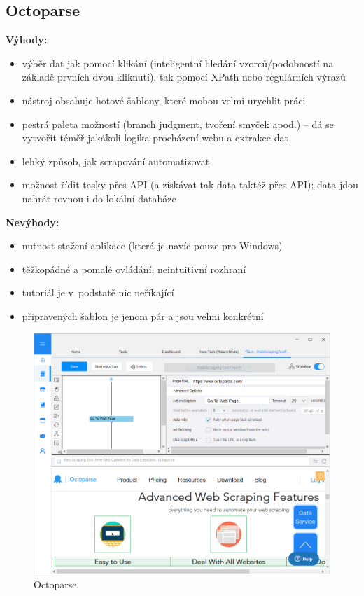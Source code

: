 \documentclass[thesis=B,czech]{FITthesis2}[2012/06/26]
\begin{document}
	
	\subsection{Octoparse}
	\textbf{Výhody:}
	\begin{itemize}
		\item výběr dat jak pomocí klikání (inteligentní hledání vzorců/podobností na základě prvních dvou kliknutí), tak pomocí XPath nebo regulárních výrazů
		\item nástroj obsahuje hotové šablony, které mohou velmi urychlit práci
		\item pestrá paleta možností (branch judgment, tvoření smyček apod.) -- dá se vytvořit téměř jakákoli logika procházení webu a extrakce dat
		\item lehký způsob, jak scrapování automatizovat
		\item možnost řídit tasky přes API (a získávat tak data taktéž přes API); data jdou nahrát rovnou i do lokální databáze
	\end{itemize}
	\textbf{Nevýhody:}
	\begin{itemize}
		\item nutnost stažení aplikace (která je navíc pouze pro Windows)
		\item těžkopádné a pomalé ovládání, neintuitivní rozhraní
		\item tutoriál je v~podstatě nic neříkající
		\item připravených šablon je jenom pár a jsou velmi konkrétní
	\end{itemize}
	\begin{figure}[h]
		\includegraphics[width=\linewidth]{images/Octoparse.png}
		\caption{Octoparse\cite[snímek pořídil autor]{octoparse}}
		\label{fig:octoparse}
	\end{figure}
	
\end{document}
